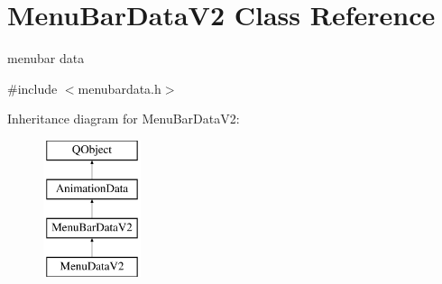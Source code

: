 \hypertarget{class_menu_bar_data_v2}{}\section{Menu\+Bar\+Data\+V2 Class Reference}
\label{class_menu_bar_data_v2}


menubar data  




{\ttfamily \#include $<$menubardata.\+h$>$}

Inheritance diagram for Menu\+Bar\+Data\+V2\+:\begin{figure}[H]
\begin{center}
\leavevmode
\includegraphics[height=4.000000cm]{class_menu_bar_data_v2}
\end{center}
\end{figure}
